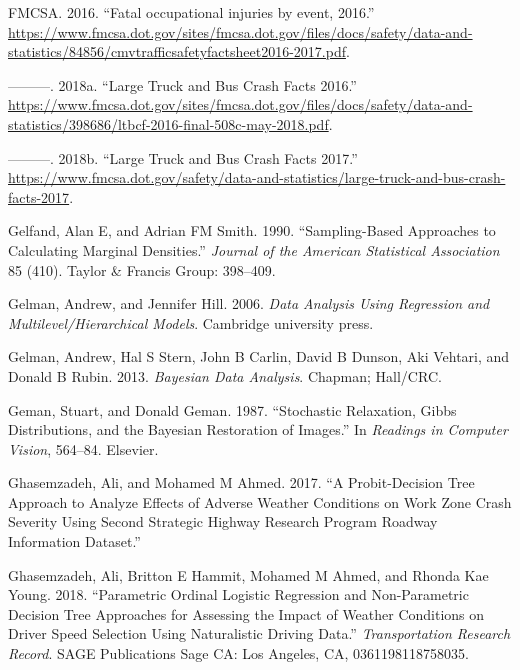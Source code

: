\documentclass[12pt]{book}
\numberwithin{equation}{chapter}
\begin{document}
\leavevmode\hypertarget{ref-fmcsafacts2016}{}%
FMCSA. 2016. ``Fatal occupational injuries by event, 2016.'' \url{https://www.fmcsa.dot.gov/sites/fmcsa.dot.gov/files/docs/safety/data-and-statistics/84856/cmvtrafficsafetyfactsheet2016-2017.pdf}.

\leavevmode\hypertarget{ref-fmcsareport2016}{}%
---------. 2018a. ``Large Truck and Bus Crash Facts 2016.'' \url{https://www.fmcsa.dot.gov/sites/fmcsa.dot.gov/files/docs/safety/data-and-statistics/398686/ltbcf-2016-final-508c-may-2018.pdf}.

\leavevmode\hypertarget{ref-fmcsareport2017}{}%
---------. 2018b. ``Large Truck and Bus Crash Facts 2017.'' \url{https://www.fmcsa.dot.gov/safety/data-and-statistics/large-truck-and-bus-crash-facts-2017}.

\leavevmode\hypertarget{ref-gelfand1990sampling}{}%
Gelfand, Alan E, and Adrian FM Smith. 1990. ``Sampling-Based Approaches to Calculating Marginal Densities.'' \emph{Journal of the American Statistical Association} 85 (410). Taylor \& Francis Group: 398--409.

\leavevmode\hypertarget{ref-gelman2006data}{}%
Gelman, Andrew, and Jennifer Hill. 2006. \emph{Data Analysis Using Regression and Multilevel/Hierarchical Models}. Cambridge university press.

\leavevmode\hypertarget{ref-gelman2013bayesian}{}%
Gelman, Andrew, Hal S Stern, John B Carlin, David B Dunson, Aki Vehtari, and Donald B Rubin. 2013. \emph{Bayesian Data Analysis}. Chapman; Hall/CRC.

\leavevmode\hypertarget{ref-geman1987stochastic}{}%
Geman, Stuart, and Donald Geman. 1987. ``Stochastic Relaxation, Gibbs Distributions, and the Bayesian Restoration of Images.'' In \emph{Readings in Computer Vision}, 564--84. Elsevier.

\leavevmode\hypertarget{ref-ghasemzadeh2017probit}{}%
Ghasemzadeh, Ali, and Mohamed M Ahmed. 2017. ``A Probit-Decision Tree Approach to Analyze Effects of Adverse Weather Conditions on Work Zone Crash Severity Using Second Strategic Highway Research Program Roadway Information Dataset.''

\leavevmode\hypertarget{ref-ghasemzadeh2018parametric}{}%
Ghasemzadeh, Ali, Britton E Hammit, Mohamed M Ahmed, and Rhonda Kae Young. 2018. ``Parametric Ordinal Logistic Regression and Non-Parametric Decision Tree Approaches for Assessing the Impact of Weather Conditions on Driver Speed Selection Using Naturalistic Driving Data.'' \emph{Transportation Research Record}. SAGE Publications Sage CA: Los Angeles, CA, 0361198118758035.
\end{document}
